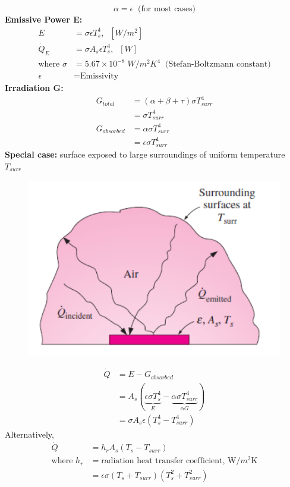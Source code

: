\begin{itemize}
    \begin{equation*}
        \alpha = \epsilon \; \; \text{(for most cases)}
    \end{equation*}
    \textbf{Emissive Power E:} 
    \begin{align*}
        E &= \sigma \epsilon T_{s}^{4}, \; \; [W/m^2] \\
        \dot{Q}_E &= \sigma A_s \epsilon T_s^4, \; \; [W]\\
        \text{where } \sigma &= 5.67\times 10^{-8} \; W/m^2 K^4 \; \; \text{(Stefan-Boltzmann constant)} \\
        \epsilon &= \text{Emissivity} 
    \end{align*}
    \textbf{Irradiation G:}
    \begin{align*}
        G_{total} &= (\alpha + \beta + \tau) \sigma T_{surr}^4 \\
        &= \sigma T_{surr}^4 \\
        G_{absorbed} &= \alpha \sigma T_{surr}^4 \\
        &= \epsilon \sigma T_{surr}^4
    \end{align*}
    \textbf{Special case:} surface exposed to large surroundings of uniform temperature $T_{surr}$
    \begin{figure}[h]
        \centering
        \includegraphics[width=0.7\linewidth]{images/radiation_special_case.png}
    \end{figure}
    \begin{align*}
        \dot{Q} &= E- G_{absorbed} \\
        &= A_s \left(\underbrace{\epsilon \sigma T_s^4}_{E} - \underbrace{\alpha \sigma T_{surr}^4}_{\alpha G}\right) \\
        &= \sigma A_s \epsilon (T_s^4 - T_{surr}^4)
    \end{align*}
    Alternatively,
    \begin{align*}
        \dot{Q} &= h_r A_s (T_s - T_{surr} ) \\
        \text{where } h_r &= \text{radiation heat transfer coefficient, W/$m^2$K}\\ 
        &=\epsilon \sigma (T_s + T_{surr})(T_s^2+T_{surr}^2)
    \end{align*}
\end{itemize}

